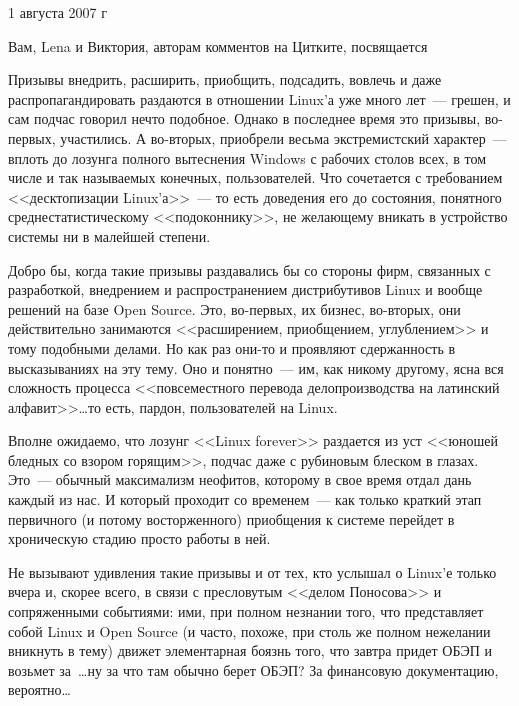 \begin{timeline}1 августа 2007 г\end{timeline}

\hfill \begin{minipage}[h]{0.45\textwidth}
Вам, Lena и Виктория, авторам комментов на Цитките, посвящается
\bigskip\end{minipage}

Призывы внедрить, расширить, приобщить, подсадить, вовлечь и даже распропагандировать раздаются в отношении Linux'а уже много лет~--- грешен, и сам подчас говорил нечто подобное. Однако в последнее время это призывы, во-первых, участились. А во-вторых, приобрели весьма экстремистский характер~--- вплоть до лозунга полного вытеснения Windows с рабочих столов всех, в том числе и так называемых конечных, пользователей. Что сочетается с требованием <<десктопизации Linux'а>>~--- то есть доведения его до состояния, понятного среднестатистическому <<подоконнику>>, не желающему вникать в устройство системы ни в малейшей степени.

Добро бы, когда такие призывы раздавались бы со стороны фирм, связанных с разработкой, внедрением и распространением дистрибутивов Linux и вообще решений на базе Open Source. Это, во-первых, их бизнес, во-вторых, они действительно занимаются <<расширением, приобщением, углублением>> и тому подобными делами. Но как раз они-то и проявляют сдержанность в высказываниях на эту тему. Оно и понятно~--- им, как никому другому, ясна вся сложность процесса <<повсеместного перевода делопроизводства на латинский алфавит>>\dots то есть, пардон, пользователей на Linux.

Вполне ожидаемо, что лозунг <<Linux forever>> раздается из уст <<юношей бледных со взором горящим>>, подчас даже с рубиновым блеском в глазах. Это~--- обычный максимализм неофитов, которому в свое время отдал дань каждый из нас. И который проходит со временем~--- как только краткий этап первичного (и потому восторженного) приобщения к системе перейдет в хроническую стадию просто работы в ней.

Не вызывают удивления такие призывы и от тех, кто услышал о Linux'е только вчера и, скорее всего, в связи с пресловутым <<делом Поносова>> и сопряженными событиями: ими, при полном незнании того, что представляет собой Linux и Open Source (и часто, похоже, при столь же полном нежелании вникнуть в тему) движет элементарная боязнь того, что завтра придет ОБЭП и возьмет за~\dots ну за что там обычно берет ОБЭП? За финансовую документацию, вероятно\dots

